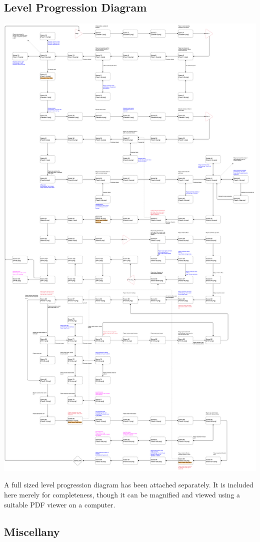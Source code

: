 \documentclass{article}
\begin{document}
	\subsection{Level Progression Diagram}
		\begin{center}
			\includegraphics[scale=0.15]{LevelProgression.pdf}
		\end{center}
		A full sized level progression diagram has been attached separately. It is included here merely for completeness, though it can be magnified and viewed using a suitable PDF viewer on a computer. 
	\subsection{Miscellany} 

\end{document}
